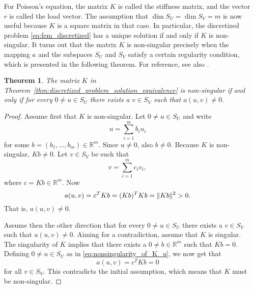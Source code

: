 \documentclass[english, 12pt, a4paper, sci, utf8, a-2b, online]{aaltothesis}
\theoremstyle{definition}
\theoremstyle{plain}
\newtheorem{theorem}{Theorem}[section]
\DeclarePairedDelimiter\norm{\lVert}{\rVert}
\numberwithin{equation}{section}
\begin{document}
For Poisson's equation, the matrix $K$ is called the stiffness matrix, and
the vector $r$ is called the load vector.
The assumption that $\dim S_U = \dim S_V = m$ is now useful
because $K$ is a square matrix in that case.
In particular, the discretized problem \eqref{eq:fem_discretized}
has a unique solution if and only if $K$ is non-singular.
It turns out that the matrix $K$ is non-singular
precisely when the mapping $a$ and the subspaces $S_U$ and $S_V$
satisfy a certain regularity condition, which is presented in the following theorem.
For reference, see also \cite{schwab1998}.
\begin{theorem}
    \label{thm:nonsingularity_of_K}
    The matrix $K$ in Theorem~\ref{thm:discretized_problem_solution_equivalence}
    is non-singular if and only if for every
    $0 \neq u \in S_U$ there exists a $v \in S_V$ such that $a(u,v) \neq 0$.
\end{theorem}
\begin{proof}
    Assume first that $K$ is non-singular.
    Let $0 \neq u \in S_U$ and write
    \begin{equation}
        \label{eq:nonsingularity_of_K_u}
        u = \sum_{i=1}^{m} b_i u_i
    \end{equation}
    for some $b = (b_1,\dotsc,b_m) \in \mathbb{R}^m$.
    Since $u \neq 0$, also $b \neq 0$.
    Because $K$ is non-singular, $Kb \neq 0$.
    Let $v \in S_V$ be such that
    \begin{equation*}
        v = \sum_{i=1}^{m} c_i v_i,
    \end{equation*}
    where $c = Kb \in \mathbb{R}^m$. Now
    \begin{equation*}
        a(u,v) = c^T Kb = (Kb)^T Kb = \norm{Kb}^2 > 0.
    \end{equation*}
    That is, $a(u,v) \neq 0$.

    Assume then the other direction that for every
    $0 \neq u \in S_U$ there exists a $v \in S_V$ such that $a(u,v) \neq 0$.
    Aiming for a contradiction, assume that $K$ is singular.
    The singularity of $K$ implies that
    there exists a $0 \neq b \in \mathbb{R}^m$ such that $Kb = 0$.
    Defining $0 \neq u \in S_U$ as in \eqref{eq:nonsingularity_of_K_u},
    we now get that
    \begin{equation*}
        a(u,v) = c^T Kb = 0
    \end{equation*}
    for all $v \in S_V$.
    This contradicts the initial assumption, which means that $K$
    must be non-singular.
\end{proof}
\end{document}
